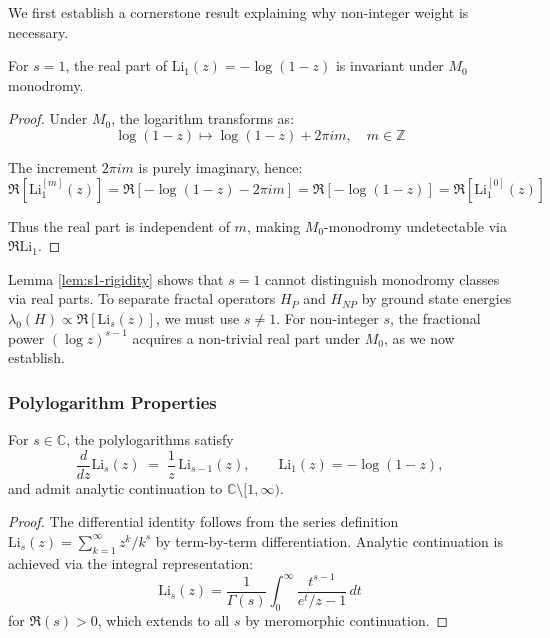 We first establish a cornerstone result explaining why non-integer weight is necessary.

\begin{lemma}[Real-Part Invariance at $s=1$]\label{lem:s1-rigidity}
For $s=1$, the real part of $\mathrm{Li}_1(z) = -\log(1-z)$ is invariant under $M_0$ monodromy.
\end{lemma}

\begin{proof}
Under $M_0$, the logarithm transforms as:
\begin{equation}
\log(1-z) \mapsto \log(1-z) + 2\pi i m, \quad m \in \mathbb{Z}
\end{equation}

The increment $2\pi i m$ is purely imaginary, hence:
\begin{equation}
\Re[\mathrm{Li}_1^{[m]}(z)] = \Re[-\log(1-z) - 2\pi i m] = \Re[-\log(1-z)] = \Re[\mathrm{Li}_1^{[0]}(z)]
\end{equation}

Thus the real part is independent of $m$, making $M_0$-monodromy undetectable via $\Re \mathrm{Li}_1$.
\end{proof}

\begin{remark}
Lemma \ref{lem:s1-rigidity} shows that $s=1$ cannot distinguish monodromy classes via real parts. To separate fractal operators $H_P$ and $H_{NP}$ by ground state energies $\lambda_0(H) \propto \Re[\mathrm{Li}_s(z)]$, we must use $s \neq 1$. For non-integer $s$, the fractional power $(\log z)^{s-1}$ acquires a non-trivial real part under $M_0$, as we now establish.
\end{remark}

\subsubsection{Polylogarithm Properties}

\begin{lemma}\label{lem:polylog-ladder}
For $s\in\mathbb{C}$, the polylogarithms satisfy
\[
\frac{d}{dz}\mathrm{Li}_s(z) \;=\; \frac{1}{z}\,\mathrm{Li}_{s-1}(z),
\qquad
\mathrm{Li}_1(z)=-\log(1-z),
\]
and admit analytic continuation to $\mathbb{C}\setminus[1,\infty)$.
\end{lemma}

\begin{proof}
The differential identity follows from the series definition $\mathrm{Li}_s(z) = \sum_{k=1}^\infty z^k/k^s$ by term-by-term differentiation. Analytic continuation is achieved via the integral representation:
\[
\mathrm{Li}_s(z) = \frac{1}{\Gamma(s)}\int_0^\infty \frac{t^{s-1}}{e^t/z - 1}\,dt
\]
for $\Re(s) > 0$, which extends to all $s$ by meromorphic continuation\cite{zagier1991polylogarithms}.
\end{proof}

